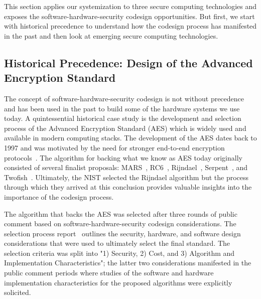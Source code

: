 
This section applies our systemization to three secure computing technologies and exposes the software-hardware-security codesign opportunities.
But first, we start with historical precedence to understand how the codesign process has manifested in the past and then look at emerging secure computing technologies.

\subsection{Historical Precedence: Design of the Advanced Encryption Standard}

The concept of software-hardware-security codesign is not without precedence and has been used in the past to build some of the hardware systems we use today.
A quintessential historical case study is the development and selection process of the Advanced Encryption Standard (AES) which is widely used and available in modern computing stacks.
The development of the AES dates back to 1997 and was motivated by the need for stronger end-to-end encryption protocols~\cite{aes_cfp}.
The algorithm for backing what we know as AES today originally consisted of several finalist proposals: MARS~\cite{mars}, RC6~\cite{rc6}, Rijndael~\cite{rijndael}, Serpent~\cite{serpent}, and Twofish~\cite{twofish}.
Ultimately, the NIST selected the Rijndael algorithm but the process through which they arrived at this conclusion provides valuable insights into the importance of the codesign process.

The algorithm that backs the AES was selected after three rounds of public comment based on software-hardware-security codesign considerations.
The selection process report~\cite{aes_selection} outlines the security, hardware, and software design considerations that were used to ultimately select the final standard.
The selection criteria was split into "1) Security, 2) Cost, and 3) Algorithm and Implementation Characteristics"; the latter two considerations manifested in the public comment periods where studies of the software and hardware implementation characteristics for the proposed algorithms were explicitly solicited.

